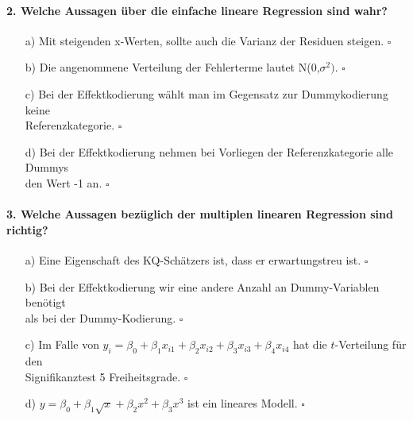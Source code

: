\documentclass[a4paper]{article}
\begin{document}
\paragraph{2. Welche Aussagen über die einfache lineare Regression sind wahr?}
\begin{itemize}
    \item[a)] Mit steigenden x-Werten, sollte auch die Varianz der Residuen steigen. \hfill $\square$
    \item[b)] Die angenommene Verteilung der Fehlerterme lautet N(0,$\sigma^2)$. \hfill $\square$
    \item[c)] Bei der Effektkodierung wählt man im Gegensatz zur Dummykodierung keine\\Referenzkategorie. \hfill $\square$
    \item[d)] Bei der Effektkodierung nehmen bei Vorliegen der Referenzkategorie alle Dummys\\den Wert -1 an. \hfill $\square$
\end{itemize}

\paragraph{3. Welche Aussagen bezüglich der multiplen linearen Regression sind richtig?}
\begin{itemize}
    \item[a)] Eine Eigenschaft des KQ-Schätzers ist, dass er erwartungstreu ist. \hfill $\square$
    \item[b)] Bei der Effektkodierung wir eine andere Anzahl an Dummy-Variablen benötigt\\als bei der Dummy-Kodierung. \hfill $\square$
    \item[c)] Im Falle von $y_i = \beta_0 + \beta_1 x_{i1} + \beta_2 x_{i2} + \beta_3 x_{i3} + \beta_4 x_{i4}$ hat die $t$-Verteilung für den\\Signifikanztest 5 Freiheitsgrade. \hfill $\square$
    \item[d)] $y = \beta_0 + \beta_1 \sqrt{x} + \beta_2 x^2 + \beta_3x^{3}$ ist ein lineares Modell. \hfill $\square$
\end{itemize}
\end{document}
